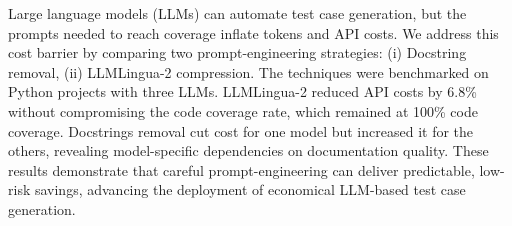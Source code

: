 Large language models (LLMs) can automate test case generation, but the prompts needed to reach coverage inflate tokens and API costs. We address this cost barrier by comparing two prompt-engineering strategies: (i) Docstring removal, (ii) LLMLingua-2 compression. The techniques were benchmarked on Python projects with three LLMs. LLMLingua-2 reduced API costs by 6.8\% without compromising the code coverage rate, which remained at 100\% code coverage. Docstrings removal cut cost for one model but increased it for the others, revealing model-specific dependencies on documentation quality. These results demonstrate that careful prompt-engineering can deliver predictable, low-risk savings, advancing the deployment of economical LLM-based test case generation.
